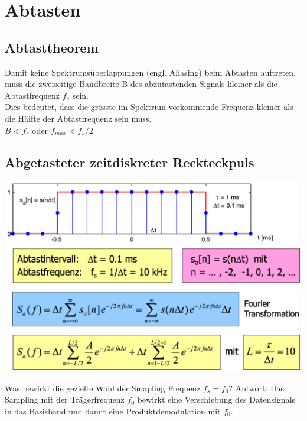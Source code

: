 
\section{Abtasten}

\subsection{Abtasttheorem}
Damit keine Spektrumsüberlappungen (engl. Aliasing) beim Abtasten auftreten, muss die zweiseitige Bandbreite B des abzutastenden Signals kleiner als die Abtastfrequenz $f_s$
sein.\\
Dies bedeutet, dass die grösste im Spektrum vorkommende Frequenz kleiner als die Hälfte der Abtastfrequenz sein muss.\\
$B<f_s$ oder $f_{max} < f_s / 2$

\subsection{Abgetasteter zeitdiskreter Reckteckpuls}
\begin{center}
    \includegraphics[width=\linewidth]{graphic/sprache-digitalisieren/Abgetasteter zeitdiskreter Reckteckpuls.png}
\end{center}
\vspace{-8pt}
Was bewirkt die gezielte Wahl der Smapling Frequenz $f_s = f_0$? Antwort: Das Sampling mit der Trägerfrequenz $f_0$ bewirkt eine Verschiebung des Datensignals in das Basisband und damit eine Produktdemodulation mit $f_0$.


